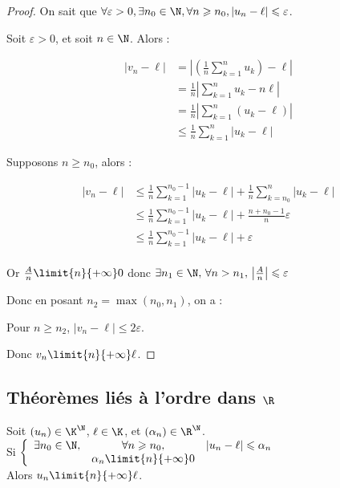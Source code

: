 \begin{proof}
    On sait que $\forall \varepsilon > 0, \exists n_0 \in \N, \forall n \geqslant n_0, |u_n - \ell| \leqslant \varepsilon$.

    Soit $\varepsilon > 0$, et soit $n \in \N$. Alors : 

    \begin{align*}
        |v_n - \ell| &= \left| \left(\frac{1}{n} \sum_{k=1}^n u_k\right) - \ell \right| \\
        &= \frac{1}{n} \left| \sum_{k=1}^n u_k - n \ell \right| \\
        &= \frac{1}{n} \left| \sum_{k=1}^n (u_k - \ell) \right| \\
        &\leqslant \frac{1}{n} \sum_{k=1}^n |u_k - \ell|
    \end{align*}
    

    Supposons $n \geqslant n_0$, alors :

    \begin{align*}
        |v_n - \ell| & \leqslant  \frac 1 n \sum_{k=1}^{n_0 - 1} |u_k - \ell| + \frac 1 n \sum_{k=n_0}^n |u_k - \ell| \\
        & \leqslant  \frac 1 n \sum_{k=1}^{n_0 - 1} |u_k - \ell| + \frac {n + n_0 - 1} n \varepsilon \\
        & \leqslant  \frac 1 n \sum_{k=1}^{n_0 - 1} |u_k - \ell| + \varepsilon \\
    \end{align*}

    Or $\frac A n \limit{n}{+\infty} 0$ donc $\exists n_1 \in \N, \, \forall n > n_1, \, \left| \frac A n \right| \leqslant \varepsilon $

    Donc en posant $n_2 = \max(n_0, n_1)$, on a : 

    Pour $n \geqslant n_2$, $|v_n - \ell| \leqslant 2\varepsilon$. 

    Donc $v_n \limit{n}{+\infty} \ell$.
\end{proof}

\subsection{Théorèmes liés à l'ordre dans \texorpdfstring{$\R$}{R}}

\begin{theoreme}{}{}
    Soit $(u_n) \in \K^{\N}$, $\ell \in \K$, et $(\alpha_n) \in \R^{\N}$. \\
    
    Si $\left\{ \begin{array}{lcl}
        \exists n_0 \in \N, & \forall n \geqslant n_0, & |u_n - \ell|\leqslant \alpha_n \\
        \space & \alpha_n \limit{n}{+\infty} 0 & \space \\
    \end{array} \right.
    $ \\

    Alors $u_n \limit{n}{+\infty} \ell$.
\end{theoreme}

